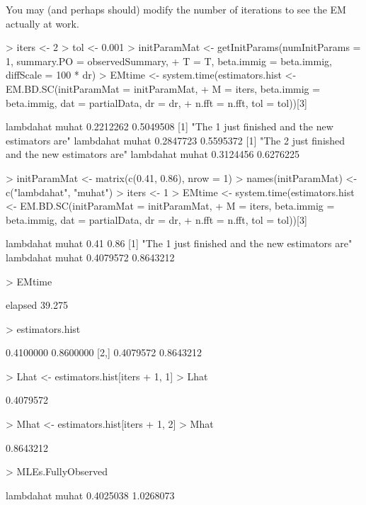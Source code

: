 \documentclass[12pt]{article}
\begin{document}
You may (and perhaps should) modify the number of iterations to see
the EM actually at work.


\begin{Schunk}
\begin{Sinput}
> iters <- 2
> tol <- 0.001
> initParamMat <- getInitParams(numInitParams = 1, summary.PO = observedSummary, 
+    T = T, beta.immig = beta.immig, diffScale = 100 * dr)
> EMtime <- system.time(estimators.hist <- EM.BD.SC(initParamMat = initParamMat, 
+    M = iters, beta.immig = beta.immig, dat = partialData, dr = dr, 
+    n.fft = n.fft, tol = tol))[3]
\end{Sinput}
\begin{Soutput}
lambdahat     muhat 
0.2212262 0.5049508 
[1] "The 1 just finished and the new estimators are"
lambdahat     muhat 
0.2847723 0.5595372 
[1] "The 2 just finished and the new estimators are"
lambdahat     muhat 
0.3124456 0.6276225 
\end{Soutput}
\begin{Sinput}
> initParamMat <- matrix(c(0.41, 0.86), nrow = 1)
> names(initParamMat) <- c("lambdahat", "muhat")
> iters <- 1
> EMtime <- system.time(estimators.hist <- EM.BD.SC(initParamMat = initParamMat, 
+    M = iters, beta.immig = beta.immig, dat = partialData, dr = dr, 
+    n.fft = n.fft, tol = tol))[3]
\end{Sinput}
\begin{Soutput}
lambdahat     muhat 
     0.41      0.86 
[1] "The 1 just finished and the new estimators are"
lambdahat     muhat 
0.4079572 0.8643212 
\end{Soutput}
\begin{Sinput}
> EMtime
\end{Sinput}
\begin{Soutput}
elapsed 
 39.275 
\end{Soutput}
\begin{Sinput}
> estimators.hist
\end{Sinput}
\begin{Soutput}
          [,1]      [,2]
[1,] 0.4100000 0.8600000
[2,] 0.4079572 0.8643212
\end{Soutput}
\begin{Sinput}
> Lhat <- estimators.hist[iters + 1, 1]
> Lhat
\end{Sinput}
\begin{Soutput}
[1] 0.4079572
\end{Soutput}
\begin{Sinput}
> Mhat <- estimators.hist[iters + 1, 2]
> Mhat
\end{Sinput}
\begin{Soutput}
[1] 0.8643212
\end{Soutput}
\begin{Sinput}
> MLEs.FullyObserved
\end{Sinput}
\begin{Soutput}
lambdahat     muhat 
0.4025038 1.0268073 
\end{Soutput}
\end{Schunk}
\end{document}
